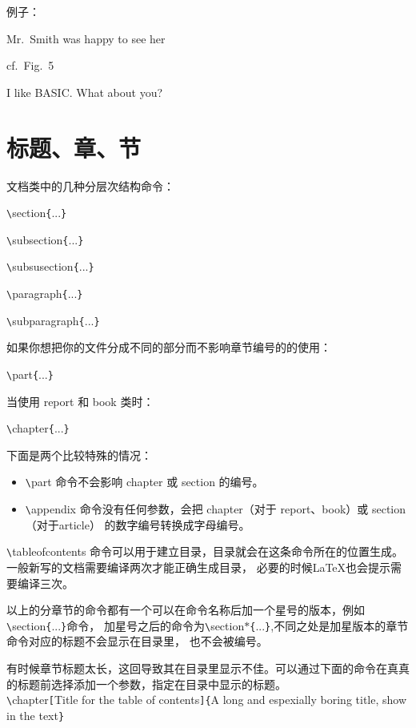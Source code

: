 \documentclass[UTF8]{ctexart}
\begin{document}
例子：

Mr.~Smith was happy to see her

cf.~Fig.~5

I like BASIC\@. What about you?
\section{标题、章、节}
文档类中的几种分层次结构命令：

\texttt{\textbackslash}section\texttt{\{}...\texttt{\}}

\texttt{\textbackslash}subsection\texttt{\{}...\texttt{\}}

\texttt{\textbackslash}subsusection\texttt{\{}...\texttt{\}}

\texttt{\textbackslash}paragraph\texttt{\{}...\texttt{\}}

\texttt{\textbackslash}subparagraph\texttt{\{}...\texttt{\}}

如果你想把你的文件分成不同的部分而不影响章节编号的的使用：

\texttt{\textbackslash}part\texttt{\{}...\texttt{\}}

当使用 report 和 book 类时：

\texttt{\textbackslash}chapter\texttt{\{}...\texttt{\}}

下面是两个比较特殊的情况：
\begin{itemize}
  \item \texttt{\textbackslash}part 命令不会影响 chapter 或 section 的编号。
  \item \texttt{\textbackslash}appendix 命令没有任何参数，会把 chapter（对于 report、book）或 section（对于article）
  的数字编号转换成字母编号。
\end{itemize}

\texttt{\textbackslash}tableofcontents 命令可以用于建立目录，目录就会在这条命令所在的位置生成。一般新写的文档需要编译两次才能正确生成目录，
必要的时候\LaTeX 也会提示需要编译三次。

以上的分章节的命令都有一个可以在命令名称后加一个星号的版本，例如\texttt{\textbackslash}section\texttt{\{}...\texttt{\}}命令，
加星号之后的命令为\texttt{\textbackslash}section\texttt{$*$}\texttt{\{}...\texttt{\}},不同之处是加星版本的章节命令对应的标题不会显示在目录里，
也不会被编号。

有时候章节标题太长，这回导致其在目录里显示不佳。可以通过下面的命令在真真的标题前选择添加一个参数，指定在目录中显示的标题。
\\

\texttt{\textbackslash}chapter\texttt{[}Title for the table of contents\texttt{]}\texttt{\{}A long and espexially boring title, show
in the text\texttt{\}}
\\
\end{document}
